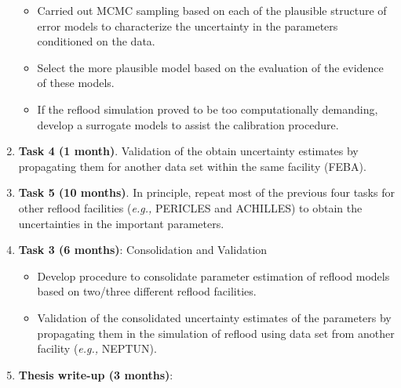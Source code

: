 \documentclass[11pt,titlepage]{article}
\begin{document}
\begin{enumerate}
\begin{itemize}
            \item Carried out MCMC sampling based on each of the plausible structure of error models to characterize the uncertainty in the parameters conditioned on the data.
            \item Select the more plausible model based on the evaluation of the evidence of these models.
            \item If the reflood simulation proved to be too computationally demanding, develop a surrogate models to assist the calibration procedure.
         \end{itemize}
   \item \textbf{Task 4 (1 month)}. Validation of the obtain uncertainty estimates by propagating them for another data set within the same facility (FEBA).
   \item \textbf{Task 5 (10 months)}. In principle, repeat most of the previous four tasks for other reflood facilities (\textit{e.g.,} PERICLES and ACHILLES) to obtain the uncertainties in the important parameters.   
   \item \textbf{Task 3 (6 months)}: Consolidation and Validation
        \begin{itemize}
            \item Develop procedure to consolidate parameter estimation of reflood models based on two/three different reflood facilities.
            \item Validation of the consolidated uncertainty estimates of the parameters by propagating them in the simulation of reflood using data set from another facility (\textit{e.g.,} NEPTUN).
        \end{itemize}
   \item \textbf{Thesis write-up (3 months)}: 
\end{enumerate}

%
%
%
%
\end{document}
